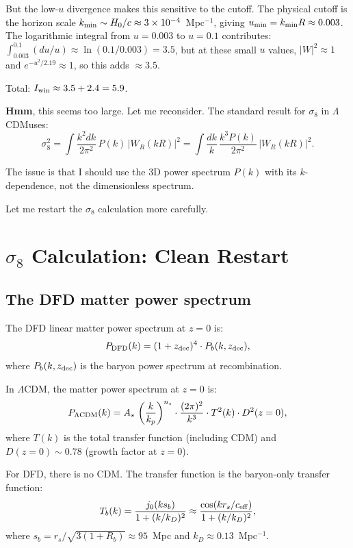 \documentclass[11pt]{article}
\newcommand{\ee}[1]{\times 10^{#1}}
\newcommand{\LCDM}{$\Lambda$CDM}
\begin{document}
But the low-$u$ divergence makes this sensitive to the cutoff.
The physical cutoff is the horizon scale $k_{\rm min} \sim H_0/c
\approx 3\ee{-4}$~Mpc$^{-1}$, giving $u_{\rm min} = k_{\rm min}R
\approx 0.003$. The logarithmic integral from $u = 0.003$ to
$u = 0.1$ contributes:
$\int_{0.003}^{0.1} (du/u)\approx \ln(0.1/0.003) = 3.5$,
but at these small $u$ values, $|W|^2 \approx 1$ and
$e^{-u^2/2.19} \approx 1$, so this adds $\approx 3.5$.

Total: $I_{\rm win} \approx 3.5 + 2.4 = 5.9$.

\textbf{Hmm}, this seems too large. Let me reconsider. The standard
result for $\sigma_8$ in \LCDM uses:
\begin{equation}
\sigma_8^2 = \int \frac{k^2 dk}{2\pi^2}\,P(k)\,|W_R(kR)|^2
= \int \frac{dk}{k}\,\frac{k^3 P(k)}{2\pi^2}\,|W_R(kR)|^2.
\end{equation}

The issue is that I should use the 3D power spectrum $P(k)$
with its $k$-dependence, not the dimensionless spectrum.

Let me restart the $\sigma_8$ calculation more carefully.

\section{$\sigma_8$ Calculation: Clean Restart}

\subsection{The DFD matter power spectrum}

The DFD linear matter power spectrum at $z = 0$ is:
\begin{equation}
P_{\rm DFD}(k) = (1+z_{\rm dec})^4\cdot P_b(k, z_{\rm dec}),
\end{equation}
where $P_b(k, z_{\rm dec})$ is the baryon power spectrum at
recombination.

In \LCDM, the matter power spectrum at $z = 0$ is:
\begin{equation}
P_{\Lambda\rm CDM}(k) = A_s\,\left(\frac{k}{k_p}\right)^{n_s}\cdot
\frac{(2\pi)^2}{k^3}\cdot T^2(k)\cdot D^2(z=0),
\end{equation}
where $T(k)$ is the total transfer function (including CDM) and
$D(z=0) \sim 0.78$ (growth factor at $z = 0$).

For DFD, there is no CDM. The transfer function is the baryon-only
transfer function:
\begin{equation}
T_b(k) = \frac{j_0(k s_b)}{1 + (k/k_D)^2}
\approx \frac{\cos(k r_s/c_{\rm eff})}{1 + (k/k_D)^2},
\end{equation}
where $s_b = r_s/\sqrt{3(1+R_b)} \approx 95$~Mpc and
$k_D \approx 0.13$~Mpc$^{-1}$.
\end{document}
